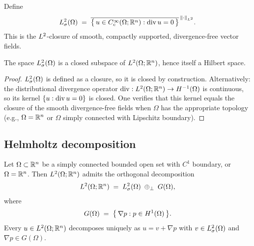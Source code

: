 \begin{definition}%
  \label{def:L2sigma}
  Define
  \[
    L^{2}_\sigma(\Omega)
    \;=\;
    \overline{
      \bigl\{\,
        u \in C^\infty_c(\Omega;\mathbb{R}^{n}) : \operatorname{div} u = 0
      \,\bigr\}
    }^{\,\left\lVert \cdot \right\rVert_{L^{2}}}.
  \]
  This is the $L^{2}$-closure of smooth, compactly supported, divergence-free vector
  fields.
\end{definition}

\begin{proposition}%
  \label{prop:L2sigma-closed}
  The space $L^{2}_\sigma(\Omega)$ is a closed subspace of $L^{2}(\Omega;\mathbb{R}^{n})$, hence
  itself a Hilbert space.
\end{proposition}

\begin{proof}
  $L^{2}_\sigma(\Omega)$ is defined as a closure, so it is closed by construction.
  Alternatively: the distributional divergence operator
  $\operatorname{div} : L^{2}(\Omega;\mathbb{R}^{n}) \to H^{-1}(\Omega)$ is continuous, so its kernel
  $\{u : \operatorname{div} u = 0\}$ is closed.  One verifies that this kernel equals the
  closure of the smooth divergence-free fields when $\Omega$ has the appropriate
  topology (e.g., $\Omega = \mathbb{R}^{n}$ or $\Omega$ simply connected with Lipschitz
  boundary).
\end{proof}

\subsection{Helmholtz decomposition}

\begin{theorem}%
  \label{thm:helmholtz}
  Let $\Omega \subset \mathbb{R}^{n}$ be a simply connected bounded open set with $C^{1}$
  boundary, or $\Omega = \mathbb{R}^{n}$.  Then $L^{2}(\Omega;\mathbb{R}^{n})$ admits the orthogonal
  decomposition
  \begin{equation}\label{eq:helmholtz}
    L^{2}(\Omega;\mathbb{R}^{n})
    \;=\;
    L^{2}_\sigma(\Omega)
    \;\oplus_{\perp}\;
    G(\Omega),
  \end{equation}
  where
  \[
    G(\Omega)
    \;=\;
    \bigl\{\,
      \nabla p : p \in H^{1}(\Omega)
    \,\bigr\}.
  \]
  Every $u \in L^{2}(\Omega;\mathbb{R}^{n})$ decomposes uniquely as
  $u = v + \nabla p$ with $v \in L^{2}_\sigma(\Omega)$ and $\nabla p \in G(\Omega)$.
\end{theorem}

